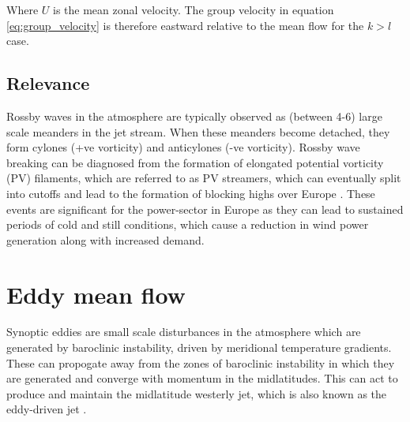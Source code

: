 \documentclass{article}
\begin{document}
Where $U$ is the mean zonal velocity. The group velocity in equation \ref{eq:group_velocity} is therefore eastward relative to the mean flow for the $k>l$ case.\\






\subsection*{Relevance}

Rossby waves in the atmosphere are typically observed as (between 4-6) large scale meanders in the jet stream. When these meanders become detached, they form cylones (+ve vorticity) and anticylones (-ve vorticity). Rossby wave breaking can be diagnosed from the formation of elongated potential vorticity (PV) filaments, which are referred to as PV streamers, which can eventually split into cutoffs and lead to the formation of blocking highs over Europe \cite{deVries2021}. These events are significant for the power-sector in Europe as they can lead to sustained periods of cold and still conditions, which cause a reduction in wind power generation along with increased demand.\\

 

\section*{Eddy mean flow}

Synoptic eddies are small scale disturbances in the atmosphere which are generated by baroclinic instability, driven by meridional temperature gradients. These can propogate away from the zones of baroclinic instability in which they are generated and converge with momentum in the midlatitudes. This can act to produce and maintain the midlatitude westerly jet, which is also known as the eddy-driven jet \cite{sang_evaluation_2022}. \\
\end{document}

